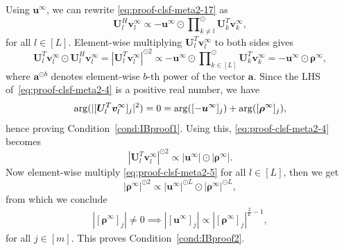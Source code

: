 \documentclass{article} %
\def\va{{\bm{a}}}
\def\vu{{\bm{u}}}
\def\vv{{\bm{v}}}
\def\mU{{\bm{U}}}
\newcommand{\vrho}{{\bm{\rho}}}
\newcommand{\Arg}{\mathop{\rm arg}}
\begin{document}
Using $\vu^\infty$, we can rewrite \eqref{eq:proof-clsf-meta2-17} as 
\begin{equation*}
    \mU_{l}^H \vv_l^\infty \propto - \vu^\infty \odot \prod\nolimits_{k \neq l}^{\odot} \mU_k^T \vv_k^\infty,
\end{equation*}
for all $l \in [L]$. Element-wise multiplying $\mU_{l}^T \vv_l^\infty$ to both sides gives
\begin{equation}
\label{eq:proof-clsf-meta2-4}
    \mU_{l}^T \vv_l^\infty \odot \mU_{l}^H \vv_l^\infty = |\mU_{l}^T \vv_l^\infty|^{\odot 2} \propto - \vu^\infty \odot \prod\nolimits_{k \in [L]}^{\odot} \mU_k^T \vv_k^\infty 
    = -\vu^\infty \odot \vrho^\infty,
\end{equation}
where $\va^{\odot b}$ denotes element-wise $b$-th power of the vector $\va$.
Since the LHS of~\eqref{eq:proof-clsf-meta2-4} is a positive real number, we have
\begin{equation*}
	\Arg(|[\mU_l^T \vv_l^\infty]_j|^2) = 0 = \Arg([-\vu^\infty]_j) + \Arg([\vrho^\infty]_j),
\end{equation*}
hence proving Condition~\ref{cond:IBproof1}.
Using this, \eqref{eq:proof-clsf-meta2-4} becomes
\begin{equation}
\label{eq:proof-clsf-meta2-5}
    |\mU_{l}^T \vv_l^\infty|^{\odot 2} \propto  |\vu^\infty| \odot |\vrho^\infty|.
\end{equation}
Now element-wise multiply \eqref{eq:proof-clsf-meta2-5} for all $l \in [L]$, then we get
\begin{equation}
\label{eq:proof-clsf-meta2-6}
    |\vrho^\infty|^{\odot 2} \propto |\vu^\infty|^{\odot L} \odot |\vrho^\infty|^{\odot L},
\end{equation}
from which we conclude
\begin{align*}
|[\vrho^\infty]_j| \neq 0 \implies |[\vu^\infty]_j| \propto |[\vrho^\infty]_j|^{\frac{2}{L}-1},
\end{align*}
for all $j \in [m]$. This proves Condition~\ref{cond:IBproof2}.
\end{document}
